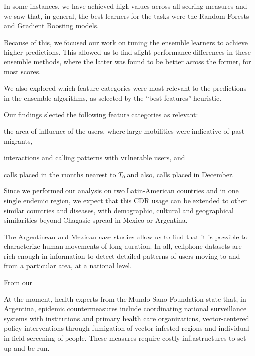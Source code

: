 In some instances, we have achieved high values across all scoring measures and we saw that, in general, the best learners for the tasks were the Random Forests and Gradient Boosting models.

Because of this, we focused our work on tuning the ensemble learners to achieve higher predictions.
This allowed us to find slight performance differences in these ensemble methods, where the latter was found to be better across the former, for most scores.

We also explored which feature categories were most relevant to the predictions in the ensemble algorithms, as selected by the ``best-features'' heuristic.

Our findings slected the following feature categories as relevant:
\begin{enumerate*}[label={\alph*)},]
\item the area of influence of the users, where large mobilities were indicative of past migrants, 
\item interactions and calling patterns with vulnerable users, and
\item calls placed in the months nearest to $T_0$ and also, calls placed in December.
\end{enumerate*}




Since we performed our analysis on two Latin-American countries and in one single endemic region, we expect that this CDR usage can be extended to other similar countries and diseases, with demographic, cultural and geographical similarities beyond Chagasic spread in Mexico or Argentina.

The Argentinean and Mexican case studies allow us to find that it is possible to characterize human movements of long duration.
In all, cellphone datasets are rich enough in information to detect detailed patterns of users moving to and from a particular area, at a national level.

From our 

At the moment, health experts from the Mundo Sano Foundation state that, in Argentina, epidemic countermeasures include coordinating national surveillance systems with institutions and primary health care organizations, vector-centered policy interventions through fumigation of vector-infested regions and individual in-field screening of people.
These measures require costly infrastructures to set up and be run.

